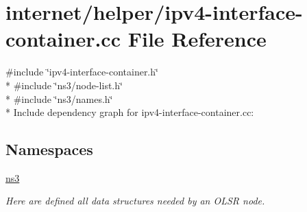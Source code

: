 \hypertarget{ipv4-interface-container_8cc}{}\section{internet/helper/ipv4-\/interface-\/container.cc File Reference}
\label{ipv4-interface-container_8cc}
{\ttfamily \#include \char`\"{}ipv4-\/interface-\/container.\+h\char`\"{}}\\*
{\ttfamily \#include \char`\"{}ns3/node-\/list.\+h\char`\"{}}\\*
{\ttfamily \#include \char`\"{}ns3/names.\+h\char`\"{}}\\*
Include dependency graph for ipv4-\/interface-\/container.cc\+:
\subsection*{Namespaces}
\begin{DoxyCompactItemize}
\item 
 \hyperlink{namespacens3}{ns3}
\begin{DoxyCompactList}\small\item\em Here are defined all data structures needed by an O\+L\+SR node. \end{DoxyCompactList}\end{DoxyCompactItemize}
